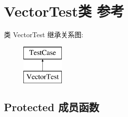 \hypertarget{class_vector_test}{}\section{Vector\+Test类 参考}
\label{class_vector_test}
类 Vector\+Test 继承关系图\+:\begin{figure}[H]
\begin{center}
\leavevmode
\includegraphics[height=2.000000cm]{class_vector_test}
\end{center}
\end{figure}
\subsection*{Protected 成员函数}
